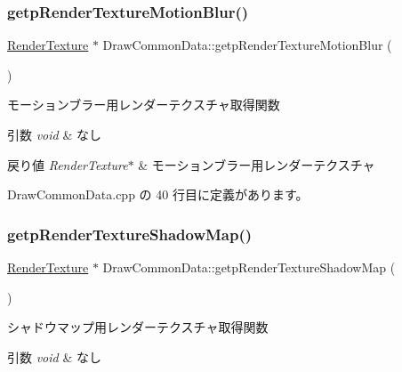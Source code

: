 \subsubsection{\texorpdfstring{getp\+Render\+Texture\+Motion\+Blur()}{getpRenderTextureMotionBlur()}}
{\footnotesize\ttfamily \mbox{\hyperlink{class_render_texture}{Render\+Texture}} $\ast$ Draw\+Common\+Data\+::getp\+Render\+Texture\+Motion\+Blur (\begin{DoxyParamCaption}{ }\end{DoxyParamCaption})}



モーションブラー用レンダーテクスチャ取得関数 


\begin{DoxyParams}{引数}
{\em void} & なし \\
\hline
\end{DoxyParams}

\begin{DoxyRetVals}{戻り値}
{\em Render\+Texture$\ast$} & モーションブラー用レンダーテクスチャ \\
\hline
\end{DoxyRetVals}


 Draw\+Common\+Data.\+cpp の 40 行目に定義があります。

\mbox{\label{class_draw_common_data_a085ce497bd36164c253b1c3200287180}} 
\subsubsection{\texorpdfstring{getp\+Render\+Texture\+Shadow\+Map()}{getpRenderTextureShadowMap()}}
{\footnotesize\ttfamily \mbox{\hyperlink{class_render_texture}{Render\+Texture}} $\ast$ Draw\+Common\+Data\+::getp\+Render\+Texture\+Shadow\+Map (\begin{DoxyParamCaption}{ }\end{DoxyParamCaption})}



シャドウマップ用レンダーテクスチャ取得関数 


\begin{DoxyParams}{引数}
{\em void} & なし \\
\hline
\end{DoxyParams}

